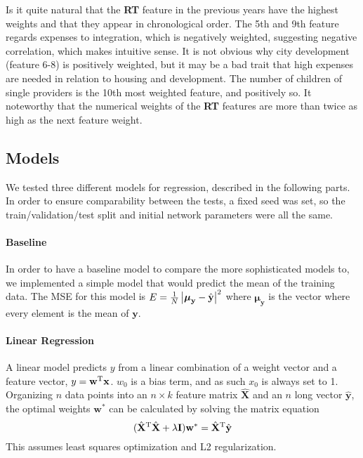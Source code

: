 Is it quite natural that the \textbf{RT} feature in the previous years have the highest weights and that they appear in chronological order.
The 5th and 9th feature regards expenses to integration, which is negatively weighted, suggesting negative correlation, which makes intuitive sense.
It is not obvious why city development (feature 6-8) is positively weighted, but it may be a bad trait that high expenses are needed in relation to housing and development.
The number of children of single providers is the 10th most weighted feature, and positively so.
It noteworthy that the numerical weights of the \textbf{RT} features are more than twice as high as the next feature weight.

\subsection{Models}
We tested three different models for regression, described in the following parts.
In order to ensure comparability between the tests, a fixed seed was set, so the train/validation/test split and initial network parameters were all the same.


\paragraph{Baseline}
In order to have a baseline model to compare the more sophisticated models to, we implemented a simple model that would predict the mean of the training data.
The MSE for this model is $ E=\frac{1}{N}\left\lvert\boldsymbol{\mu}_{\mathbf y}-\hat{\mathbf y}\right\rvert^2 $ where $ \boldsymbol{\mu}_{\mathbf y} $ is the vector where every element is the mean of $ \mathbf y $.

\paragraph{Linear Regression}
A linear model predicts $ y $ from a linear combination of a weight vector and a feature vector, $ y=\mathbf w^{\textup T}\mathbf x $.
$ w_0 $ is a bias term, and as such $ x_0 $ is always set to 1.
Organizing $ n $ data points into an $ n\times k $ feature matrix $ \hat{\mathbf X} $ and an $ n $ long vector $ \hat{\mathbf y} $, the optimal weights $ \mathbf w^* $ can be calculated by solving the matrix equation
\begin{equation*}
	(\hat{\mathbf X}^{\textup T}\hat{\mathbf X}+\lambda \mathbf I)\mathbf w^*=\hat{\mathbf X}^{\textup T}\hat{\mathbf{y}}
\end{equation*}
This assumes least squares optimization and L2 regularization.

